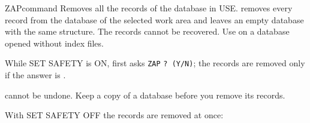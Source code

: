 \begin{XbaseEntry}{ZAP}{command}
Removes all the records of the database in USE.
\Syntax
{}
\Usage
{} removes every record from the database of the selected work area and
leaves an empty database with the same structure.  The records cannot be
recovered.  Use  on a database opened without index files.

While SET SAFETY is ON,  first asks \texttt{ZAP} \texttt{? (Y/N)};
the records are removed only if the answer is .
\begin{AteWarning}
 cannot be undone.  Keep a copy of a database before you remove its
records.
\end{AteWarning}
\Examples
{}
With SET SAFETY OFF the records are removed at once:
\end{XbaseEntry}

